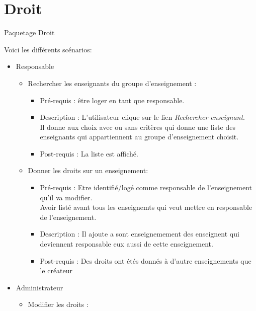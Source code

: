 	\section{Droit}

\begin{center}
\par{Paquetage Droit}
\end{center}
Voici les diff{\'e}rents sc{\'e}narios:\\
	\begin{itemize}
	\item Responsable
		\begin{itemize}	
		\item Rechercher les enseignants du groupe d'enseignement :
			\begin{itemize}
			\item Pr{\'e}-requis : {\^e}tre loger en tant que responsable.
			\item Description : L'utilisateur clique sur le lien {\it Rechercher enseignant}.\\
			Il donne aux choix avec ou sans crit{\`e}res qui donne une liste des enseignants qui appartiennent au groupe d'enseignement choisit.
			\item Post-requis : La liste est affich{\'e}.
			\end{itemize}
		\end{itemize}	
		\begin{itemize}
		\item Donner les droits sur un enseignement:
			\begin{itemize}
			\item Pr{\'e}-requis : Etre identifi{\'e}/log{\'e} comme responsable de l'enseignement qu'il va modifier.\\
			Avoir list{\'e} avant tous les enseignemts qui veut mettre en responsable de l'enseignement. 
			\item Description : Il ajoute a sont enseignemement des enseignent qui deviennent responsable eux aussi de cette enseignement.
			\item Post-requis : Des droits ont {\'e}t{\'e}s donn{\'e}s {\`a} d'autre enseignements que le cr{\'e}ateur
			\end{itemize}
		\end{itemize}
	\item Administrateur
		\begin{itemize}
		\item Modifier les droits :

\end{itemize}
\end{itemize}
